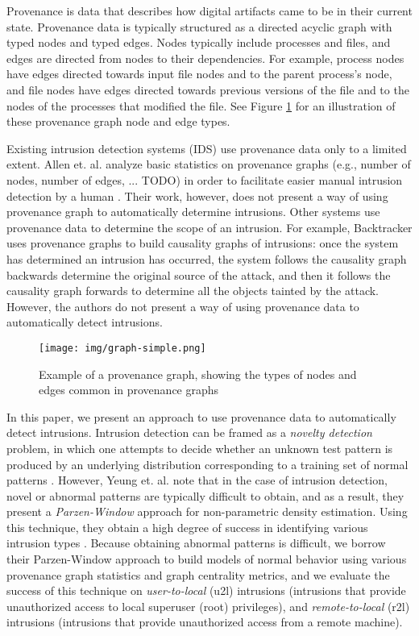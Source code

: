 \documentclass[10pt,twocolumn]{article}
\begin{document}
Provenance is data that describes how digital artifacts
came to be in their current state. Provenance data is typically structured as a directed acyclic graph with
typed nodes and typed edges.
Nodes typically include processes and files, and edges are directed from nodes to their dependencies. For example,
process nodes have edges directed towards input file nodes and to the parent process's node, and
file nodes have edges directed towards previous versions of the file and to the nodes of the
processes that modified the file. See Figure \ref{graph-simple} for an illustration of these provenance
graph node and edge types.

Existing intrusion detection systems (IDS) use provenance data only to a limited extent.
Allen et. al. analyze
basic statistics on provenance graphs (e.g., number of nodes, number of edges, ... TODO) in order to facilitate
easier manual intrusion detection by a human \cite{provstat}. Their work, however, does not present a way of using provenance
graph to automatically determine intrusions. Other systems use provenance data to determine the scope of an
intrusion. For example, Backtracker \cite{backtracker} uses provenance graphs to build causality graphs of intrusions: once the
system has
determined an intrusion has occurred, the system follows the causality graph backwards determine the original source of the attack, and 
then it follows the causality graph forwards to determine all the objects tainted by the attack. However, the authors 
do not present a way of using provenance data to automatically detect intrusions.

\begin{figure}
  \label{graph-simple}
  \centering
    \texttt{[image: img/graph-simple.png]}
    \caption{Example of a provenance graph, showing the types of nodes and edges common in provenance graphs} 
\end{figure}

In this paper, we present an approach to use provenance data to automatically detect intrusions. Intrusion
detection can be framed as a {\em novelty detection} problem, in which one attempts to decide whether
an unknown test pattern is produced by an underlying distribution corresponding to a training set
of normal patterns \cite{parzen}. However, Yeung et. al. note that in the case of intrusion detection, novel
or abnormal patterns are typically difficult to obtain, and as a result, they present a {\em Parzen-Window} approach
for non-parametric density estimation. Using this technique, they obtain a high degree of success
in identifying various intrusion types \cite{parzen}. Because obtaining abnormal patterns is difficult, 
we borrow their Parzen-Window approach to build models of normal behavior using 
various provenance graph statistics and graph centrality metrics, and we evaluate the success of this technique
on {\em user-to-local} (u2l) intrusions (intrusions that provide unauthorized access to local superuser (root) privileges),
and {\em remote-to-local} (r2l) intrusions (intrusions that provide unauthorized access from a remote machine).
\end{document}
